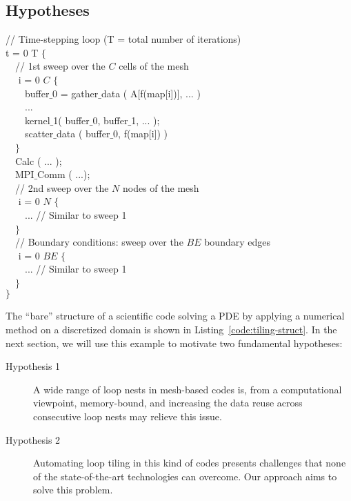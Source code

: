 \subsection{Hypotheses}
\label{sec:tiling:struct}

\begin{algorithm}
\scriptsize\ttfamily
{}

// Time-stepping loop (T = total number of iterations)\\
 t = 0  T $\lbrace$\\
~~// 1st sweep over the $C$ cells of the mesh\\
~~ i = 0  $C$ $\lbrace$\\
~~~~buffer$\_$0 = gather$\_$data ( A[f(map[i])], ... )\\
~~~~...\\
~~~~kernel$\_$1( buffer$\_$0, buffer$\_$1, ... );\\
~~~~scatter$\_$data ( buffer$\_$0, f(map[i]) )\\
~~$\rbrace$\\
~~Calc ( ... );\\
~~MPI$\_$Comm ( ...); \\
~~// 2nd sweep over the $N$ nodes of the mesh\\
~~ i = 0  $N$ $\lbrace$\\
~~~~... // Similar to sweep 1 \\
~~$\rbrace$\\
~~// Boundary conditions: sweep over the $BE$ boundary edges\\
~~ i = 0  $BE$ $\lbrace$\\
~~~~... // Similar to sweep 1 \\
~~$\rbrace$\\
$\rbrace$
\caption{....}
\label{code:tiling-struct}
\end{algorithm}

The ``bare'' structure of a scientific code solving a PDE by applying a numerical method on a discretized domain is shown in Listing~\ref{code:tiling-struct}. In the next section, we will use this example to motivate two fundamental hypotheses:

\begin{description}
\item[Hypothesis 1] A wide range of loop nests in mesh-based codes is, from a computational viewpoint, memory-bound, and increasing the data reuse across consecutive loop nests may relieve this issue.
\item[Hypothesis 2] Automating loop tiling in this kind of codes presents challenges that none of the state-of-the-art technologies can overcome. Our approach aims to solve this problem.
\end{description}



